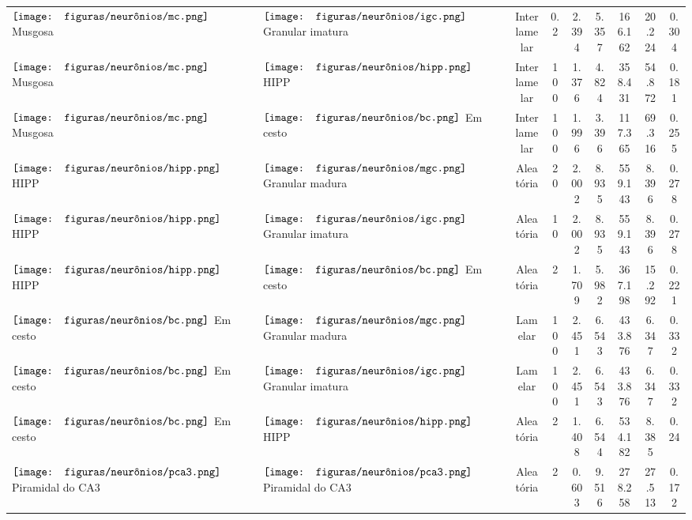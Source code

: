 \begin{table}[h!]
{\begin{tabular}{llccccccc}
$\vcenter{\hbox{\texttt{[image: figuras/neurônios/mc.png]}}}$ Musgosa & $\vcenter{\hbox{\texttt{[image: figuras/neurônios/igc.png]}}}$ Granular imatura & Interlamelar & 0.2 & 2.394 & 5.357 & 166.162 & 20.224 & 0.304 \\
$\vcenter{\hbox{\texttt{[image: figuras/neurônios/mc.png]}}}$ Musgosa & $\vcenter{\hbox{\texttt{[image: figuras/neurônios/hipp.png]}}}$ HIPP & Interlamelar & 100 & 1.376 & 4.824 & 358.431 & 54.872 & 0.181 \\
$\vcenter{\hbox{\texttt{[image: figuras/neurônios/mc.png]}}}$ Musgosa & $\vcenter{\hbox{\texttt{[image: figuras/neurônios/bc.png]}}}$ Em cesto & Interlamelar & 100 & 1.996 & 3.396 & 117.365 & 69.316 & 0.255 \\
$\vcenter{\hbox{\texttt{[image: figuras/neurônios/hipp.png]}}}$ HIPP & $\vcenter{\hbox{\texttt{[image: figuras/neurônios/mgc.png]}}}$ Granular madura & Aleatória & 20 & 2.002 & 8.935 & 559.143 & 8.396 & 0.278 \\
$\vcenter{\hbox{\texttt{[image: figuras/neurônios/hipp.png]}}}$ HIPP & $\vcenter{\hbox{\texttt{[image: figuras/neurônios/igc.png]}}}$ Granular imatura & Aleatória & 10 & 2.002 & 8.935 & 559.143 & 8.396 & 0.278 \\
$\vcenter{\hbox{\texttt{[image: figuras/neurônios/hipp.png]}}}$ HIPP & $\vcenter{\hbox{\texttt{[image: figuras/neurônios/bc.png]}}}$ Em cesto & Aleatória & 2 & 1.709 & 5.982 & 367.198 & 15.292 & 0.221 \\
$\vcenter{\hbox{\texttt{[image: figuras/neurônios/bc.png]}}}$ Em cesto & $\vcenter{\hbox{\texttt{[image: figuras/neurônios/mgc.png]}}}$ Granular madura & Lamelar & 100 & 2.451 & 6.543 & 433.876 & 6.347 & 0.332 \\
$\vcenter{\hbox{\texttt{[image: figuras/neurônios/bc.png]}}}$ Em cesto & $\vcenter{\hbox{\texttt{[image: figuras/neurônios/igc.png]}}}$ Granular imatura & Lamelar & 100 & 2.451 & 6.543 & 433.876 & 6.347 & 0.332 \\
$\vcenter{\hbox{\texttt{[image: figuras/neurônios/bc.png]}}}$ Em cesto & $\vcenter{\hbox{\texttt{[image: figuras/neurônios/hipp.png]}}}$ HIPP & Aleatória & 2 & 1.408 & 6.544 & 534.182 & 8.385 & 0.24 \\
$\vcenter{\hbox{\texttt{[image: figuras/neurônios/pca3.png]}}}$ Piramidal do CA3 & $\vcenter{\hbox{\texttt{[image: figuras/neurônios/pca3.png]}}}$ Piramidal do CA3 & Aleatória & 2 & 0.603 & 9.516 & 278.258 & 27.513 & 0.172 \\

\end{tabular}}
\end{table}
